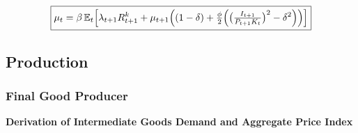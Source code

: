 \documentclass[11pt,preprint]{elsarticle}
\numberwithin{equation}{section}
\numberwithin{figure}{section}
\numberwithin{table}{section}
\begin{document}
\begin{equation}\label{foc_K_app}
\boxed{\mu_t = \beta\,\mathbb{E}_t\Bigl[
        \lambda_{t+1}R^k_{t+1}
      + \mu_{t+1}\Bigl(
          (1-\delta)
        + \tfrac{\phi}{2}\Bigl(
            \bigl(\tfrac{I_{t+1}}{P_{t+1}K_t}\bigr)^2
          - \delta^2
          \Bigr)
        \Bigr)
      \Bigr]}  
\end{equation}

\subsection{Production}\label{production-1}

\subsubsection{\texorpdfstring{Final Good Producer
\label{final_good_producer_appendix}}{Final Good Producer }}\label{final-good-producer}

\textbf{Derivation of Intermediate Goods Demand and Aggregate Price
Index}
\end{document}
